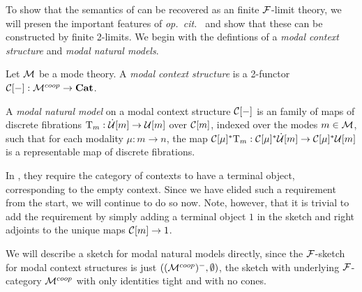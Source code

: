 \documentclass[../thesis.tex]{subfiles}
\begin{document}
To show that the semantics of \cite[{§5}]{gratzer2021} can be recovered as an finite ${\mathcal{F}}$-limit theory, we will
presen the important features of \emph{op.\ cit.\ } and show that these can be constructed by finite 2-limits. We
begin with the defintions of a \emph{modal context structure} and \emph{modal natural models}.
\begin{definition}
  Let ${\mathcal{M}}$ be a mode theory. A \emph{modal context structure} is a 2-functor ${\mathcal{C}}[-] : {\mathcal{M}}^{coop} \to {\mathbf{Cat}}$. 

  A \emph{modal natural model} on a modal context structure ${\mathcal{C}}[-]$ is an family of maps of discrete fibrations
  ${{\mathrm{T}}}_m : \dot{{\mathcal{U}}}[m] \to {\mathcal{U}}[m]$ over ${\mathcal{C}}[m]$, indexed over the modes $m \in {\mathcal{M}}$, such that for each modality
  $\mu : m \to n$, the map ${\mathcal{C}}[\mu]^*{{\mathrm{T}}}_m : {\mathcal{C}}[\mu]^*\dot{{\mathcal{U}}}[m] \to {\mathcal{C}}[\mu]^*{\mathcal{U}}[m]$ is a representable map of
  discrete fibrations.
\end{definition}
\begin{remark}
  In \cite{gratzer2021}, they require the category of contexts to have a terminal object, corresponding to the empty
  context. Since we have elided such a requirement from the start, we will continue to do so now. Note, however, that
  it is trivial to add the requirement by simply adding a terminal object $1$ in the sketch and right adjoints to the
  unique maps ${\mathcal{C}}[m] \to 1$.
\end{remark}
We will describe a sketch for modal natural models directly, since the ${\mathcal{F}}$-sketch for modal context structures is
just $(({\mathcal{M}}^{coop})^-, \emptyset)$, the sketch with underlying ${\mathcal{F}}$-category ${\mathcal{M}}^{coop}$ with only identities tight
and with no cones. 
\end{document}
